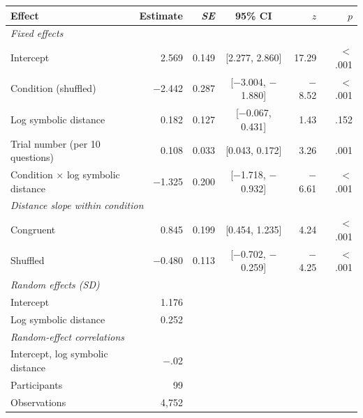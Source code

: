 \begin{tabular}{lrrcrr}
\toprule
Effect & Estimate & \textit{SE} & 95\% CI & $z$ & $p$ \\
\midrule
\multicolumn{6}{l}{\textit{Fixed effects}} \\
\quad Intercept & 2.569 & 0.149 & [2.277, 2.860] & 17.29 & $<$.001 \\
\quad Condition (shuffled) & $-$2.442 & 0.287 & [$-$3.004, $-$1.880] & $-$8.52 & $<$.001 \\
\quad Log symbolic distance & 0.182 & 0.127 & [$-$0.067, 0.431] & 1.43 & .152 \\
\quad Trial number (per 10 questions) & 0.108 & 0.033 & [0.043, 0.172] & 3.26 & .001 \\
\quad Condition $\times$ log symbolic distance & $-$1.325 & 0.200 & [$-$1.718, $-$0.932] & $-$6.61 & $<$.001 \\
\multicolumn{6}{l}{\textit{Distance slope within condition}} \\
\quad Congruent & 0.845 & 0.199 & [0.454, 1.235] & 4.24 & $<$.001 \\
\quad Shuffled & $-$0.480 & 0.113 & [$-$0.702, $-$0.259] & $-$4.25 & $<$.001 \\
\multicolumn{6}{l}{\textit{Random effects (SD)}} \\
\quad Intercept & 1.176 \\
\quad Log symbolic distance & 0.252 \\
\multicolumn{6}{l}{\textit{Random-effect correlations}} \\
\quad Intercept, log symbolic distance & $-$.02 \\
\midrule
Participants & 99 \\
Observations & 4,752 \\
\bottomrule
\end{tabular}
